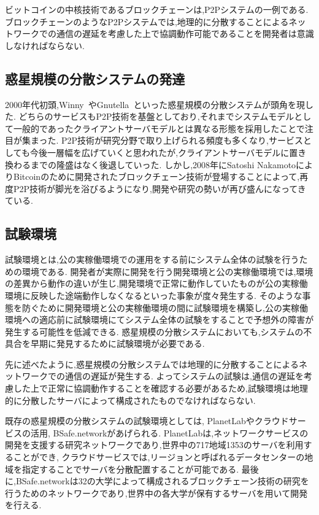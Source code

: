 ビットコインの中核技術であるブロックチェーンは,P2Pシステムの一例である.
ブロックチェーンのようなP2Pシステムでは,地理的に分散することによるネットワークでの通信の遅延を考慮した上で協調動作可能であることを開発者は意識しなければならない.

\subsection{惑星規模の分散システムの発達}

2000年代初頭,Winny~\cite{Winny}やGnutella~\cite{Gnutella}といった惑星規模の分散システムが頭角を現した.
どちらのサービスもP2P技術を基盤としており,それまでシステムモデルとして一般的であったクライアントサーバモデルとは異なる形態を採用したことで注目が集まった.
P2P技術が研究分野で取り上げられる頻度も多くなり,サービスとしても今後一層幅を広げていくと思われたが,クライアントサーバモデルに置き換わるまでの隆盛はなく後退していった.
しかし,2008年にSatoshi NakamotoによりBitcoinのために開発されたブロックチェーン技術が登場することによって,再度P2P技術が脚光を浴びるようになり,開発や研究の勢いが再び盛んになってきている.

\subsection{試験環境}

試験環境とは,公の実稼働環境での運用をする前にシステム全体の試験を行うための環境である.
開発者が実際に開発を行う開発環境と公の実稼働環境では,環境の差異から動作の違いが生じ,開発環境で正常に動作していたものが公の実稼働環境に反映した途端動作しなくなるといった事象が度々発生する.
そのような事態を防ぐために開発環境と公の実稼働環境の間に試験環境を構築し,公の実稼働環境への適応前に試験環境にてシステム全体の試験をすることで予想外の障害が発生する可能性を低減できる.
惑星規模の分散システムにおいても,システムの不具合を早期に発見するために試験環境が必要である.

先に述べたように,惑星規模の分散システムでは地理的に分散することによるネットワークでの通信の遅延が発生する.
よってシステムの試験は,通信の遅延を考慮した上で正常に協調動作することを確認する必要があるため,試験環境は地理的に分散したサーバによって構成されたものでなければならない.

既存の惑星規模の分散システムの試験環境としては, PlanetLabやクラウドサービスの活用, BSafe.networkがあげられる.
PlanetLabは,ネットワークサービスの開発を支援する研究ネットワークであり,世界中の717地域1353のサーバを利用することができ,
クラウドサービスでは,リージョンと呼ばれるデータセンターの地域を指定することでサーバを分散配置することが可能である.
最後に,BSafe.networkは32の大学によって構成されるブロックチェーン技術の研究を行うためのネットワークであり,世界中の各大学が保有するサーバを用いて開発を行える.

